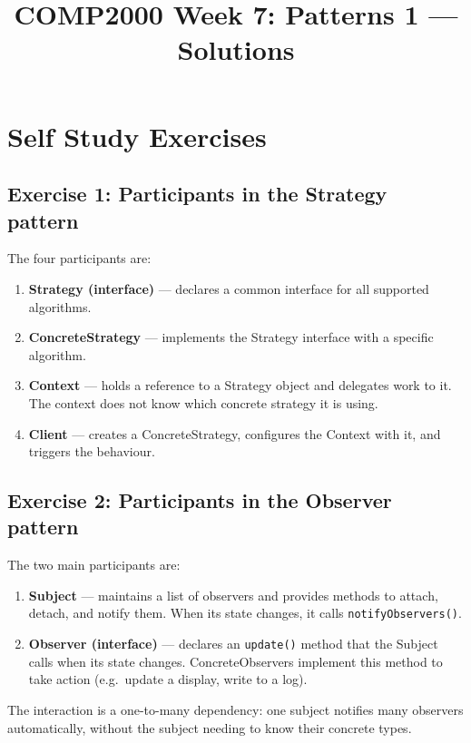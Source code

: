 \documentclass[twoside=false,DIV=14]{scrartcl}
\title{\color{redish} \vspace{-1em}COMP2000 Week 7: Patterns 1 --- Solutions}
\begin{document}
{\color{blackish}\maketitle}\vspace{-7em}

\section*{Self Study Exercises}

\subsection*{Exercise 1: Participants in the Strategy pattern}

The four participants are:
\begin{enumerate}
    \item \textbf{Strategy (interface)} --- declares a common interface for all supported algorithms.
    \item \textbf{ConcreteStrategy} --- implements the Strategy interface with a specific algorithm.
    \item \textbf{Context} --- holds a reference to a Strategy object and delegates work to it.  The context does not know which concrete strategy it is using.
    \item \textbf{Client} --- creates a ConcreteStrategy, configures the Context with it, and triggers the behaviour.
\end{enumerate}

\subsection*{Exercise 2: Participants in the Observer pattern}

The two main participants are:
\begin{enumerate}
    \item \textbf{Subject} --- maintains a list of observers and provides methods to attach, detach, and notify them.  When its state changes, it calls \texttt{notifyObservers()}.
    \item \textbf{Observer (interface)} --- declares an \texttt{update()} method that the Subject calls when its state changes.  ConcreteObservers implement this method to take action (e.g.\ update a display, write to a log).
\end{enumerate}
The interaction is a one-to-many dependency: one subject notifies many observers automatically, without the subject needing to know their concrete types.
\end{document}
